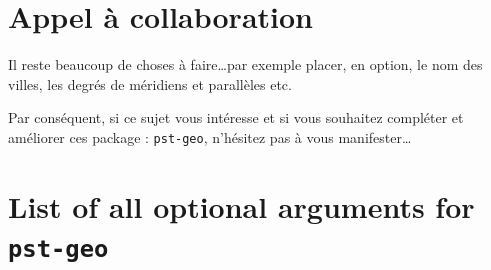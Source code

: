 \documentclass[11pt,french,BCOR10mm,DIV12,bibliography=totoc,parskip=false,
   smallheadings, headexclude,footexclude,oneside]{pst-doc}
\begin{document}
\section{Appel à collaboration}
Il reste beaucoup de choses à faire\ldots par exemple placer, en option, le
nom des villes, les degrés de méridiens et parallèles etc.

Par conséquent, si ce sujet vous intéresse et si vous souhaitez compléter et
améliorer ces package : \texttt{pst-geo}, n'hésitez pas à vous manifester\ldots



\clearpage
\section{List of all optional arguments for \texttt{pst-geo}}

\bgroup
\RaggedRight
\nocite{*}
\printbibliography
\egroup

\printindex
\end{document}

